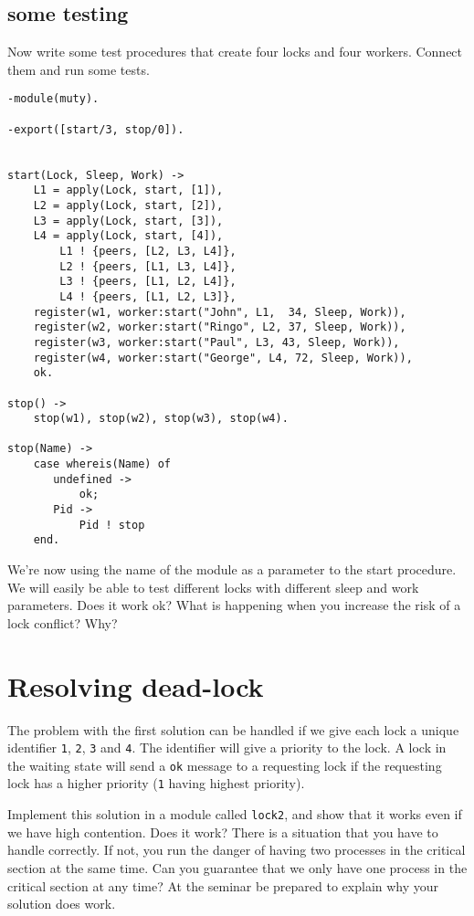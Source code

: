 \documentclass[a4paper, 11pt]{article}
\begin{document}
\subsection{some testing}

Now write some test procedures that create four locks and four
workers. Connect them and run some tests.

\begin{verbatim}
-module(muty).

-export([start/3, stop/0]).


start(Lock, Sleep, Work) ->
	L1 = apply(Lock, start, [1]),
	L2 = apply(Lock, start, [2]),
	L3 = apply(Lock, start, [3]),
	L4 = apply(Lock, start, [4]),
        L1 ! {peers, [L2, L3, L4]},
        L2 ! {peers, [L1, L3, L4]},
        L3 ! {peers, [L1, L2, L4]},
        L4 ! {peers, [L1, L2, L3]},
	register(w1, worker:start("John", L1,  34, Sleep, Work)),
	register(w2, worker:start("Ringo", L2, 37, Sleep, Work)),
	register(w3, worker:start("Paul", L3, 43, Sleep, Work)),
	register(w4, worker:start("George", L4, 72, Sleep, Work)),
	ok.

stop() ->
    stop(w1), stop(w2), stop(w3), stop(w4).

stop(Name) ->
    case whereis(Name) of
       undefined -> 
           ok;
       Pid ->  
           Pid ! stop
    end.
\end{verbatim}

We're now using the name of the module as a parameter to the start
procedure. We will easily be able to test different locks with
different sleep and work parameters. Does it work ok? What is happening
when you increase the risk of a lock conflict? Why?

\section{Resolving dead-lock}

The problem with the first solution can be handled if we give each
lock a unique identifier {\tt 1}, {\tt 2}, {\tt 3} and {\tt 4}. The
identifier will give a priority to the lock. A lock in the waiting
state will send a {\tt ok} message to a requesting lock if the
requesting lock has a higher priority ({\tt 1} having highest
priority).

Implement this solution in a module called {\tt lock2}, and show that
it works even if we have high contention. Does it work? There is a
situation that you have to handle correctly. If not, you run the
danger of having two processes in the critical section at the same
time. Can you guarantee that we only have one process in the critical
section at any time? At the seminar be prepared to explain why your
solution does work.
\end{document}
